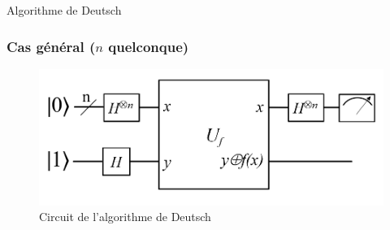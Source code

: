 \documentclass[aspectratio=169]{beamer}
\theoremstyle{plain}
\theoremstyle{definition}
\begin{document}
\begin{frame}{Algorithme de Deutsch}
\end{frame}

\begin{frame}
    \frametitle{Cas général ($n$ quelconque)}
    \begin{figure}[!ht]
        \centering
        \includegraphics[scale=0.5]{deutsch-circuit-n.png}
        \caption{Circuit de l'algorithme de Deutsch}
    \end{figure}
\end{frame}
\end{document}
